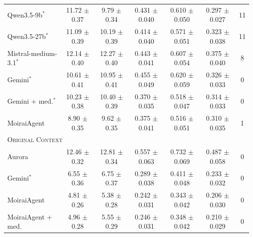 \documentclass[]{servicenow}
\begin{document}
\begin{table}[h]
{\begin{tabular}{lcccccc}
\hspace{1.2em}Qwen3.5-9b$^\ast$             & 11.72 $\pm$ 0.37          & 9.79 $\pm$ 0.34  & 0.431 $\pm$ 0.040 & 0.610 $\pm$ 0.050 & 0.297 $\pm$ 0.027 & 11 \\
\hspace{1.2em}Qwen3.5-27b$^\ast$            & 11.09 $\pm$ 0.39          & 10.19 $\pm$ 0.39 & 0.414 $\pm$ 0.040 & 0.571 $\pm$ 0.051 & 0.323 $\pm$ 0.038 & 11 \\
\hspace{1.2em}Mistral-medium-3.1$^\ast$     & 12.14 $\pm$ 0.40          & 12.27 $\pm$ 0.40          & 0.443 $\pm$ 0.041 & 0.607 $\pm$ 0.054 & 0.375 $\pm$ 0.040 & 8  \\
\hspace{1.2em}Gemini$^\ast$                 & 10.61 $\pm$ 0.41          & 10.95 $\pm$ 0.41          & 0.455 $\pm$ 0.049 & 0.620 $\pm$ 0.059 & 0.326 $\pm$ 0.033 & 0  \\
\hspace{1.2em}Gemini + med.$^\ast$          & 10.23 $\pm$ 0.38          & 10.40 $\pm$ 0.39          & 0.370 $\pm$ 0.035 & 0.518 $\pm$ 0.047 & 0.314 $\pm$ 0.033 & 0  \\
\hspace{1.2em}MoiraiAgent                   & 8.90 $\pm$ 0.35  & 9.62 $\pm$ 0.35  & 0.375 $\pm$ 0.041 & 0.516 $\pm$ 0.051 & 0.310 $\pm$ 0.035 & 1  \\
\midrule
\multicolumn{7}{l}{\textsc{Original Context}} \\
\addlinespace[2pt]
\hspace{1.2em}Aurora                        & 12.46 $\pm$ 0.32          & 12.81 $\pm$ 0.34          & 0.557 $\pm$ 0.063          & 0.732 $\pm$ 0.069          & 0.487 $\pm$ 0.058          & 0  \\
\hspace{1.2em}Gemini$^\ast$                 & 6.55 $\pm$ 0.36           & 6.75 $\pm$ 0.37           & 0.289 $\pm$ 0.038 & 0.411 $\pm$ 0.048 & 0.233 $\pm$ 0.032 & 0  \\
\hspace{1.2em}MoiraiAgent                   & 4.81 $\pm$ 0.26  & 5.38 $\pm$ 0.28  & 0.242 $\pm$ 0.031 & 0.343 $\pm$ 0.042 & 0.206 $\pm$ 0.030 & 0  \\
\hspace{1.2em}MoiraiAgent + med.            & 4.96 $\pm$ 0.28  & 5.55 $\pm$ 0.29  & 0.246 $\pm$ 0.031 & 0.348 $\pm$ 0.042 & 0.210 $\pm$ 0.029 & 0  \\
\bottomrule
\end{tabular}%
}
\end{table}
\end{document}
